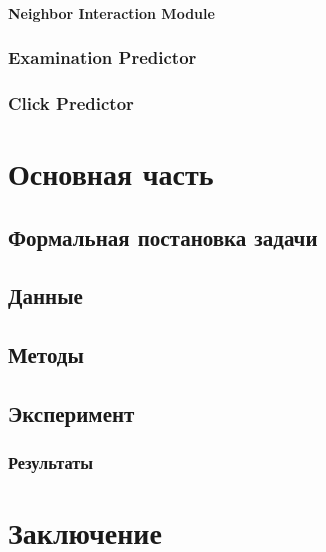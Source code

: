 \documentclass[diploma]{nanolab2015}
\begin{document}

\subsubsection{Neighbor Interaction Module}




\subsection{Examination Predictor}
\subsection{Click Predictor}
\chapter{Основная часть}
\section{Формальная постановка задачи}
\section{Данные}
\section{Методы}
\section{Эксперимент}
\subsection{Результаты}


\chapter{Заключение}
\end{document}

